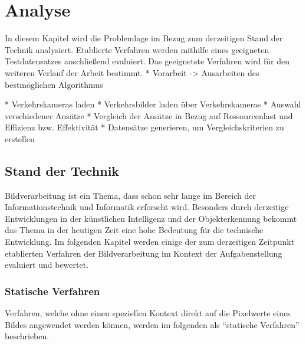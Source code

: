 \chapter{Analyse}
In diesem Kapitel wird die Problemlage im Bezug zum derzeitigen Stand der Technik analysiert.
Etablierte Verfahren werden mithilfe eines geeigneten Testdatensatzes anschließend evaluiert.
Das geeignetste Verfahren wird für den weiteren Verlauf der Arbeit bestimmt.
* Vorarbeit -> Ausarbeiten des bestmöglichen Algorithmus\newline

* Verkehrskameras laden\newline
* Verkehrsbilder laden über Verkehrskameras\newline
* Auswahl verschiedener Ansätze\newline
* Vergleich der Ansätze in Bezug auf Ressourcenlast und Effizienz bzw. Effektivität\newline
* Datensätze generieren, um Vergleichskriterien zu erstellen\newline

\section{Stand der Technik}
Bildverarbeitung ist ein Thema, dass schon sehr lange im Bereich der Informationstechnik und Informatik erforscht wird.
Besonders durch derzeitige Entwicklungen in der künstlichen Intelligenz und der Objekterkennung bekommt das Thema in der heutigen Zeit eine hohe Bedeutung für die technische Entwicklung. Im folgenden Kapitel werden einige der zum derzeitigen Zeitpunkt etablierten Verfahren der Bildverarbeitung im Kontext der Aufgabenstellung evaluiert und bewertet.

\subsection{Statische Verfahren}
Verfahren, welche ohne einen speziellen Kontext direkt auf die Pixelwerte eines Bildes angewendet werden können, werden im folgenden als "`statische Verfahren"' beschrieben.
